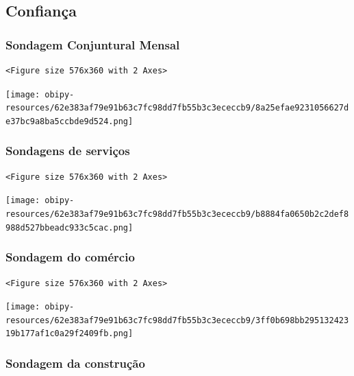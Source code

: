 \documentclass[11pt]{article}
\begin{document}
\subsection{Confiança}
\label{sec:org4bd21a3}


\subsubsection{Sondagem Conjuntural Mensal}
\label{sec:orge7ce4b1}

\begin{verbatim}
<Figure size 576x360 with 2 Axes>
\end{verbatim}


\begin{center}
\texttt{[image: obipy-resources/62e383af79e91b63c7fc98dd7fb55b3c3ececcb9/8a25efae9231056627de37bc9a8ba5ccbde9d524.png]}
\end{center}

\subsubsection{Sondagens de serviços}
\label{sec:orgd7e0ea3}

\begin{verbatim}
<Figure size 576x360 with 2 Axes>
\end{verbatim}


\begin{center}
\texttt{[image: obipy-resources/62e383af79e91b63c7fc98dd7fb55b3c3ececcb9/b8884fa0650b2c2def8988d527bbeadc933c5cac.png]}
\end{center}


\subsubsection{Sondagem do comércio}
\label{sec:orgaeb74f8}

\begin{verbatim}
<Figure size 576x360 with 2 Axes>
\end{verbatim}


\begin{center}
\texttt{[image: obipy-resources/62e383af79e91b63c7fc98dd7fb55b3c3ececcb9/3ff0b698bb29513242319b177af1c0a29f2409fb.png]}
\end{center}

\subsubsection{Sondagem da construção}
\label{sec:org5e24c14}
\end{document}
